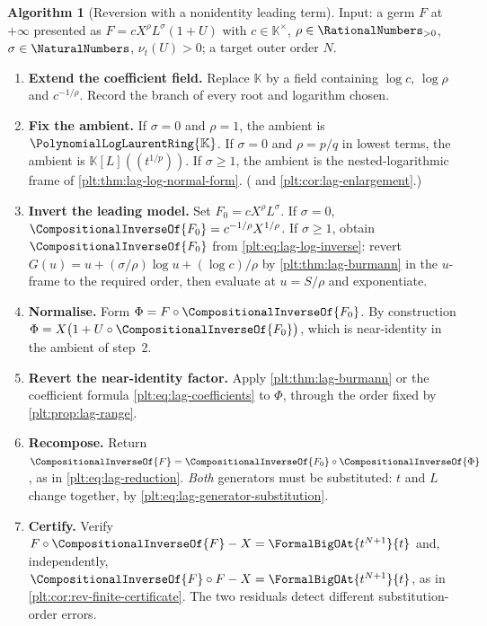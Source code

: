 \documentclass[11pt,oneside]{article}
\theoremstyle{plain}
\theoremstyle{definition}
\newtheorem{algorithm}[theorem]{Algorithm}
\theoremstyle{remark}
\newcommand{\K}{\mathbb{K}}
\newcommand{\PLlau}{\PolynomialLogLaurentRing{\K}}       %
\newcommand{\ordt}{\nu_{t}}                              %
\newcommand{\compose}{\mathbin{\circ}}
\newcommand{\rev}[1]{\CompositionalInverseOf{#1}}
\begin{document}
\begin{algorithm}[Reversion with a nonidentity leading term]
\label{plt:alg:lag-dominant-balance}
Input: a germ \(F\) at \(+\infty\) presented as
\(F=cX^{\rho}L^{\sigma}(1+U)\) with \(c\in\K^\times\),
\(\rho\in\RationalNumbers_{>0}\), \(\sigma\in\NaturalNumbers\),
\(\ordt(U)>0\); a target outer order \(N\).
\begin{enumerate}
\item \textbf{Extend the coefficient field.}  Replace \(\K\) by a field
      containing \(\log c\), \(\log\rho\) and \(c^{-1/\rho}\).  Record the
      branch of every root and logarithm chosen.
\item \textbf{Fix the ambient.}  If \(\sigma=0\) and \(\rho=1\), the ambient is
      \(\PLlau\).  If \(\sigma=0\) and \(\rho=p/q\) in lowest terms, the ambient
      is \(\K[L]((t^{1/p}))\).  If \(\sigma\ge1\), the ambient is the
      nested-logarithmic frame of \cref{plt:thm:lag-log-normal-form}.
      ( and \cref{plt:cor:lag-enlargement}.)
\item \textbf{Invert the leading model.}  Set \(F_0=cX^{\rho}L^{\sigma}\).  If
      \(\sigma=0\), \(\rev{F_0}=c^{-1/\rho}X^{1/\rho}\).  If \(\sigma\ge1\),
      obtain \(\rev{F_0}\) from
      \cref{plt:eq:lag-log-inverse}: revert
      \(G(u)=u+(\sigma/\rho)\log u+(\log c)/\rho\) by
      \cref{plt:thm:lag-burmann} in the \(u\)-frame to the required order, then
      evaluate at \(u=S/\rho\) and exponentiate.
\item \textbf{Normalise.}  Form \(\Phi=F\compose\rev{F_0}\).  By construction
      \(\Phi=X\bigl(1+U\compose\rev{F_0}\bigr)\), which is near-identity in the
      ambient of step~2.
\item \textbf{Revert the near-identity factor.}  Apply
      \cref{plt:thm:lag-burmann} or the coefficient formula
      \cref{plt:eq:lag-coefficients} to \(\Phi\), through the order fixed by
      \cref{plt:prop:lag-range}.
\item \textbf{Recompose.}  Return \(\rev{F}=\rev{F_0}\compose\rev{\Phi}\), as in
      \cref{plt:eq:lag-reduction}.  \emph{Both} generators must be substituted:
      \(t\) and \(L\) change together, by
      \cref{plt:eq:lag-generator-substitution}.
\item \textbf{Certify.}  Verify \(F\compose\rev{F}-X=\FormalBigOAt{t^{N+1}}{t}\)
      and, independently, \(\rev{F}\compose F-X=\FormalBigOAt{t^{N+1}}{t}\), as
      in \cref{plt:cor:rev-finite-certificate}.  The two residuals detect different
      substitution-order errors.
\end{enumerate}
\end{algorithm}
\end{document}
